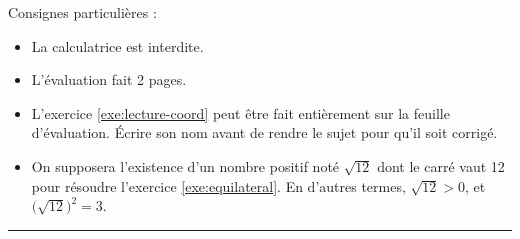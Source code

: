 

\SetDate[07/10/2025]
\reversemarginpar

\setlength{\marginparsep}{.5cm}


\pagestyle{fancy}
\fancyhead[R]{\today}

\null\vspace{-30pt}
Consignes particulières : 
\begin{itemize}[label=$\bullet$]
	\item 
	La calculatrice est {interdite}.
	\item
	L'évaluation fait 2 pages.
	\item
	L'exercice \ref{exe:lecture-coord} peut être fait entièrement sur la feuille d'évaluation. Écrire son nom avant de rendre le sujet pour qu'il soit corrigé.
	\item 
	On supposera l'existence d'un nombre positif noté $\sqrt{12}$ dont le carré vaut 12 pour résoudre l'exercice \ref{exe:equilateral}.
	En d'autres termes, $\sqrt{12} > 0$, et $\bigl(\sqrt{12}\bigr)^2 = 3$.
\end{itemize}

\marginpar{[pts]}
\hrule






















